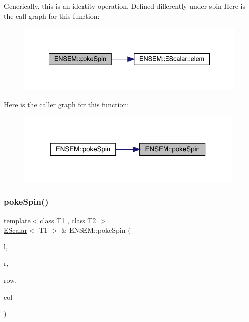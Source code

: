 Generically, this is an identity operation. Defined differently under spin Here is the call graph for this function\+:
\nopagebreak
\begin{figure}[H]
\begin{center}
\leavevmode
\includegraphics[width=334pt]{d4/dca/group__escalar_gae8b2f2d3c5fedfb458392f11d78f2c88_cgraph}
\end{center}
\end{figure}
Here is the caller graph for this function\+:
\nopagebreak
\begin{figure}[H]
\begin{center}
\leavevmode
\includegraphics[width=314pt]{d4/dca/group__escalar_gae8b2f2d3c5fedfb458392f11d78f2c88_icgraph}
\end{center}
\end{figure}
\mbox{\label{group__escalar_ga7f41ec60f3cfb7ed2f965af5b8a81132}} 
\subsubsection{\texorpdfstring{pokeSpin()}{pokeSpin()}\hspace{0.1cm}{\footnotesize\ttfamily [2/2]}}
{\footnotesize\ttfamily template$<$class T1 , class T2 $>$ \\
\mbox{\hyperlink{classENSEM_1_1EScalar}{E\+Scalar}}$<$ T1 $>$ \& E\+N\+S\+E\+M\+::poke\+Spin (\begin{DoxyParamCaption}\item[{\mbox{\hyperlink{classENSEM_1_1EScalar}{E\+Scalar}}$<$ T1 $>$ \&}]{l,  }\item[{const \mbox{\hyperlink{classENSEM_1_1EScalar}{E\+Scalar}}$<$ T2 $>$ \&}]{r,  }\item[{int}]{row,  }\item[{int}]{col }\end{DoxyParamCaption})\hspace{0.3cm}{\ttfamily [inline]}}



